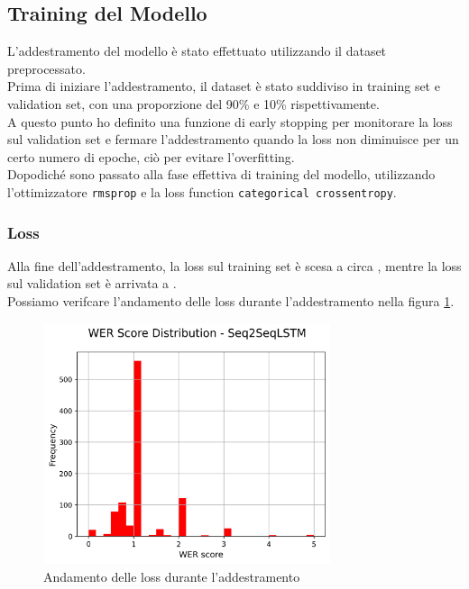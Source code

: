 \documentclass[a4paper, 12pt]{article}
\begin{document}
\subsection{Training del Modello}
L'addestramento del modello è stato effettuato utilizzando il dataset preprocessato.\\
Prima di iniziare l'addestramento, il dataset è stato suddiviso in training set e validation set, con una proporzione del 90\% e 10\% rispettivamente.\\
A questo punto ho definito una funzione di early stopping per monitorare la loss sul validation set e fermare l'addestramento quando la loss non diminuisce per un certo numero di epoche, ciò per evitare l'overfitting.\\
Dopodiché sono passato alla fase effettiva di training del modello, utilizzando l'ottimizzatore \texttt{rmsprop} e la loss function \texttt{categorical crossentropy}.\\

\subsubsection{Loss}
Alla fine dell'addestramento, la loss sul training set è scesa a circa , mentre la loss sul validation set è arrivata a .\\
Possiamo verifcare l'andamento delle loss durante l'addestramento nella figura \ref{fig:loss_plot}.
\begin{figure}[H]
    \centering
    \includegraphics[width=0.75\textwidth]{media/Seq2SeqLSTM_wer_scores.png}
    \caption{Andamento delle loss durante l'addestramento}
    \label{fig:loss_plot}
\end{figure}
\end{document}
